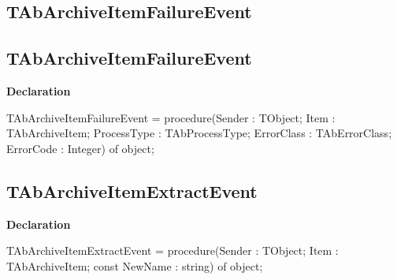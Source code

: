 \documentclass{report}
\newif\ifpdf
\begin{document}
\subsection*{\large{\textbf{TAbArchiveItemFailureEvent}}\normalsize\hspace{1ex}\hrulefill}
\else
\subsection*{TAbArchiveItemFailureEvent}
\fi
\label{AbArcTyp-TAbArchiveItemFailureEvent}
\begin{list}{}{
\setlength{\itemindent}{0cm}
\setlength{\listparindent}{0cm}
\setlength{\leftmargin}{\evensidemargin}
\addtolength{\leftmargin}{\tmplength}
\settowidth{\labelsep}{X}
\addtolength{\leftmargin}{\labelsep}
\setlength{\labelwidth}{\tmplength}
}
\item[\textbf{Declaration}\hfill]
\ifpdf
\begin{flushleft}
\fi
\begin{ttfamily}
TAbArchiveItemFailureEvent = procedure(Sender : TObject; Item : TAbArchiveItem; ProcessType : TAbProcessType; ErrorClass : TAbErrorClass; ErrorCode : Integer) of object;\end{ttfamily}

\ifpdf
\end{flushleft}
\fi

\end{list}
\ifpdf
\subsection*{\large{\textbf{TAbArchiveItemExtractEvent}}\normalsize\hspace{1ex}\hrulefill}
\else
\subsection*{TAbArchiveItemExtractEvent}
\fi
\label{AbArcTyp-TAbArchiveItemExtractEvent}
\begin{list}{}{
\setlength{\itemindent}{0cm}
\setlength{\listparindent}{0cm}
\setlength{\leftmargin}{\evensidemargin}
\addtolength{\leftmargin}{\tmplength}
\settowidth{\labelsep}{X}
\addtolength{\leftmargin}{\labelsep}
\setlength{\labelwidth}{\tmplength}
}
\item[\textbf{Declaration}\hfill]
\ifpdf
\begin{flushleft}
\fi
\begin{ttfamily}
TAbArchiveItemExtractEvent = procedure(Sender : TObject; Item : TAbArchiveItem; const NewName : string) of object;\end{ttfamily}

\ifpdf
\end{flushleft}
\fi

\end{list}
\ifpdf
\end{document}
